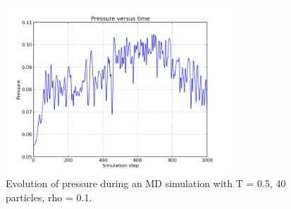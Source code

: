 \documentclass{article}
\begin{document}
\begin{enumerate}[resume]
        \begin{figure}[h!]
            \begin{center}
                \includegraphics[width=0.75\textwidth]{pressure.png}
                \caption{Evolution of pressure during an MD simulation with T = 0.5, 40 particles, rho = 0.1.}
                \label{fig:pressure}
            \end{center}
        \end{figure}

\end{enumerate}

\end{document}
